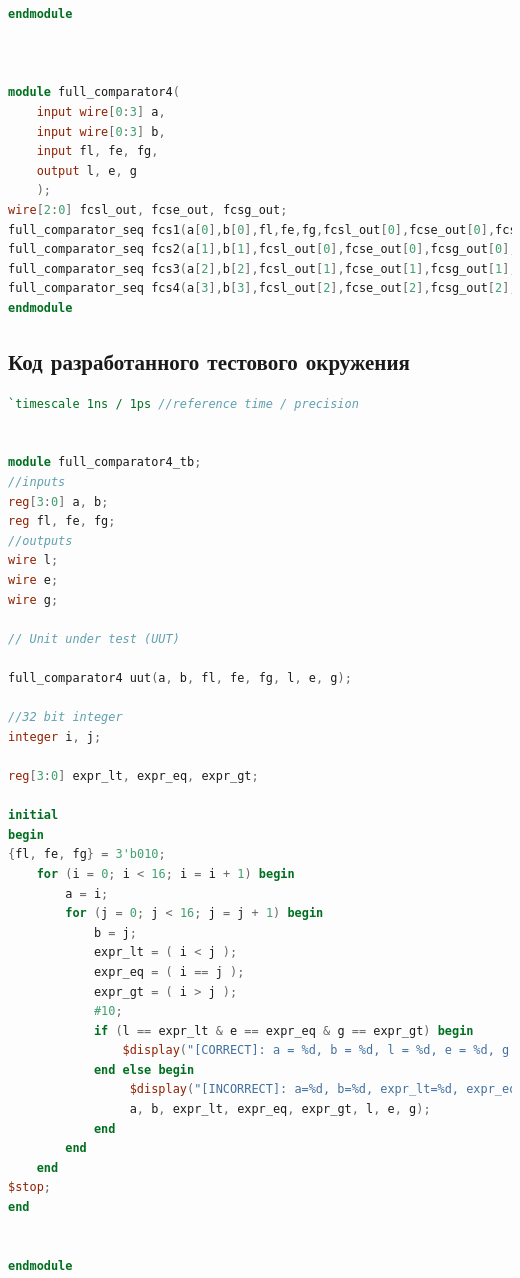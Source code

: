 \documentclass[12pt,onecolumn]{article}
\begin{document}
\begin{lstlisting}[style=verilog, language=Verilog]
endmodule



module full_comparator4(
    input wire[0:3] a,
    input wire[0:3] b,
    input fl, fe, fg,
    output l, e, g
    );
wire[2:0] fcsl_out, fcse_out, fcsg_out;
full_comparator_seq fcs1(a[0],b[0],fl,fe,fg,fcsl_out[0],fcse_out[0],fcsg_out[0]);
full_comparator_seq fcs2(a[1],b[1],fcsl_out[0],fcse_out[0],fcsg_out[0], fcsl_out[1],fcse_out[1],fcsg_out[1]);
full_comparator_seq fcs3(a[2],b[2],fcsl_out[1],fcse_out[1],fcsg_out[1], fcsl_out[2],fcse_out[2],fcsg_out[2]);
full_comparator_seq fcs4(a[3],b[3],fcsl_out[2],fcse_out[2],fcsg_out[2],l,e,g);    
endmodule

\end{lstlisting}

\subsection{Код разработанного тестового окружения}
\begin{lstlisting}[style=verilog, language=Verilog]
`timescale 1ns / 1ps //reference time / precision


module full_comparator4_tb;
//inputs
reg[3:0] a, b;
reg fl, fe, fg;
//outputs
wire l;
wire e;
wire g;

// Unit under test (UUT)

full_comparator4 uut(a, b, fl, fe, fg, l, e, g);

//32 bit integer
integer i, j;

reg[3:0] expr_lt, expr_eq, expr_gt;

initial
begin
{fl, fe, fg} = 3'b010;
    for (i = 0; i < 16; i = i + 1) begin
        a = i;
        for (j = 0; j < 16; j = j + 1) begin
            b = j;
            expr_lt = ( i < j );
            expr_eq = ( i == j );
            expr_gt = ( i > j );
            #10;
            if (l == expr_lt & e == expr_eq & g == expr_gt) begin
                $display("[CORRECT]: a = %d, b = %d, l = %d, e = %d, g = %d", a, b, l, e, g);
            end else begin
                 $display("[INCORRECT]: a=%d, b=%d, expr_lt=%d, expr_eq=%d, expr_gt=%d, l=%d, e=%d, g=%d",
                 a, b, expr_lt, expr_eq, expr_gt, l, e, g);
            end
        end
    end
$stop;
end


endmodule

\end{lstlisting}
\end{document}
